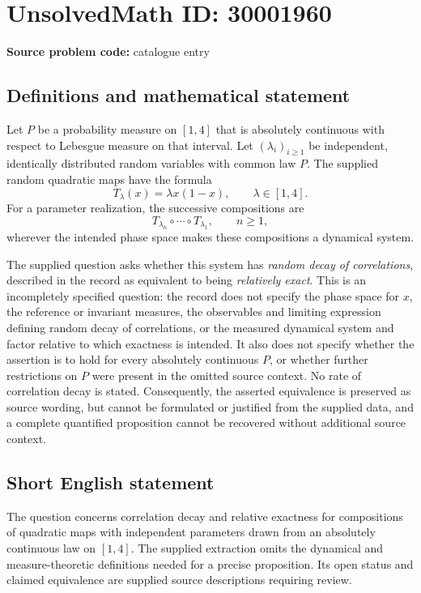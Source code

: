 \documentclass[11pt]{article}
\begin{document}
\section*{UnsolvedMath ID: 30001960}
\textbf{Source problem code:} catalogue entry
\subsection{Definitions and mathematical statement}
Let \(P\) be a probability measure on \([1,4]\) that is absolutely continuous with respect to Lebesgue measure on that interval. Let \((\lambda_i)_{i\geq 1}\) be independent, identically distributed random variables with common law \(P\). The supplied random quadratic maps have the formula
\[
T_\lambda(x)=\lambda x(1-x),\qquad \lambda\in[1,4].
\]
For a parameter realization, the successive compositions are
\[
T_{\lambda_n}\circ\cdots\circ T_{\lambda_1},\qquad n\geq 1,
\]
wherever the intended phase space makes these compositions a dynamical system.

The supplied question asks whether this system has \emph{random decay of correlations}, described in the record as equivalent to being \emph{relatively exact}. This is an incompletely specified question: the record does not specify the phase space for \(x\), the reference or invariant measures, the observables and limiting expression defining random decay of correlations, or the measured dynamical system and factor relative to which exactness is intended. It also does not specify whether the assertion is to hold for every absolutely continuous \(P\), or whether further restrictions on \(P\) were present in the omitted source context. No rate of correlation decay is stated. Consequently, the asserted equivalence is preserved as source wording, but cannot be formulated or justified from the supplied data, and a complete quantified proposition cannot be recovered without additional source context.
\subsection{Short English statement}
The question concerns correlation decay and relative exactness for compositions of quadratic maps with independent parameters drawn from an absolutely continuous law on \([1,4]\). The supplied extraction omits the dynamical and measure-theoretic definitions needed for a precise proposition. Its open status and claimed equivalence are supplied source descriptions requiring review.
\end{document}
